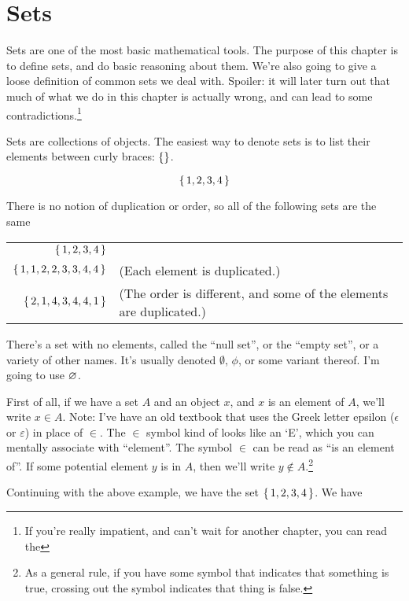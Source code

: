 \chapter{Sets}

Sets are one of the most basic mathematical tools. The purpose of this
chapter is to define sets, and do basic reasoning about them. We're
also going to give a loose definition of common sets we deal
with. Spoiler: it will later turn out that much of what we do in this
chapter is actually wrong, and can lead to some
contradictions.\footnote{If you're really impatient, and can't wait
  for another chapter, you can read the }

Sets are collections of objects. The easiest way to denote sets is to
list their elements between curly braces: $\left\{  \right\}$.

\begin{displaymath}
  \left\{ \, 1,2,3,4 \, \right\}
\end{displaymath}

There is no notion of duplication or order, so all of the following
sets are the same

\begin{tabu}{rp{5.5cm}}
  $\left\{ \, 1,2,3,4 \, \right\}$         & \\
  $\left\{ \, 1,1,2,2,3,3,4,4 \, \right\}$ & (Each element is duplicated.) \\
  $\left\{ \, 2,1,4,3,4,4,1 \, \right\}$   & (The order is different, and some of the elements are duplicated.)
\end{tabu}

There's a set with no elements, called the ``null set'', or the
``empty set'', or a variety of other names. It's usually denoted
$\emptyset$, $\phi$, or some variant thereof. I'm going to use $\varnothing$.

First of all, if we have a set $A$ and an object $x$, and $x$ is an
element of $A$, we'll write $x \in A$. Note: I've have an old textbook
that uses the Greek letter epsilon ($\epsilon$ or $\varepsilon$) in
place of $\in$. The $\in$ symbol kind of looks like an `E', which you
can mentally associate with ``element''. The symbol $\in$ can be read
as ``is an element of''. If some potential element $y$ is  in
$A$, then we'll write $y \notin A$.\footnote{As a general rule, if you
  have some symbol that indicates that something is true, crossing out
  the symbol indicates that thing is false.}

Continuing with the above example, we have the set
$\left\{ \, 1,2,3,4 \, \right\}$. We have

